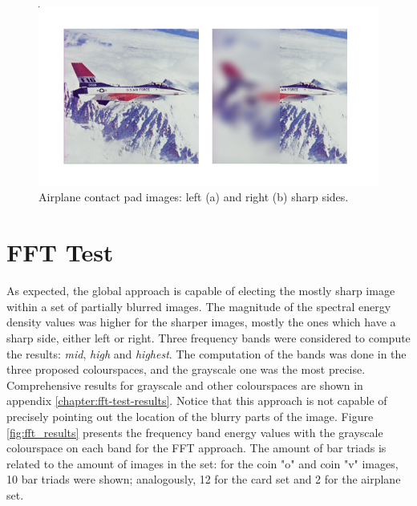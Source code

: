 \begin{figure}[H]
	\centering
	\caption{\label{fig:airplane_set_images}Airplane contact pad images: left (a) and right (b) sharp sides.}
	\begin{center}
	    \includegraphics[scale=0.6, trim = {0 1cm 0 1cm}]{images/fig19.png}
	\end{center}
	\centering
    \fautor
\end{figure}

\section{FFT Test}
\label{sec:fft-test}

As expected, the global approach is capable of electing the mostly sharp image within a set of partially blurred images. The magnitude of the spectral energy density values was higher for the sharper images, mostly the ones which have a sharp side, either left or right. Three frequency bands were considered to compute the results: \emph{mid}, \emph{high} and \emph{highest}. The computation of the bands was done in the three proposed colourspaces, and the grayscale one was the most precise. Comprehensive results for grayscale and other colourspaces are shown in appendix \ref{chapter:fft-test-results}. Notice that this approach is not capable of precisely pointing out the location of the blurry parts of the image. Figure \ref{fig:fft_results} presents the frequency band energy values with the grayscale colourspace on each band for the FFT approach. The amount of bar triads is related to the amount of images in the set: for the coin "o" and coin "v" images, 10 bar triads were shown; analogously, 12 for the card set and 2 for the airplane set.

